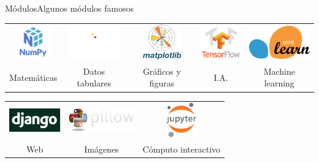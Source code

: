 \documentclass[aspectratio=169,10pt]{beamer}
\begin{document}
\begin{frame}{Módulos}{Algunos módulos famosos}
  \begin{table}[]
    \centering
    \begin{tabular}{@{}ccccc@{}}
      \includegraphics[height=1.5cm]{numpy.png} & \includegraphics[height=1.5cm]{pandas.png} & \includegraphics[height=1.5cm]{matplotlib.png} & \includegraphics[height=1.5cm]{tensorflow.png} & \includegraphics[height=1.5cm]{scikit.png} \\
      Matemáticas                               & Datos tabulares                            & Gráficos y figuras                             & I.A.                                           & Machine learning
    \end{tabular}
  \end{table}


  \begin{table}[]
    \centering
    \begin{tabular}{@{}ccc@{}}
      \includegraphics[height=1cm]{django.png} & \includegraphics[height=1cm]{pillow.png} & \includegraphics[height=1.5cm]{jupyter.png} \\
      Web                                      & Imágenes                                 & Cómputo interactivo
    \end{tabular}
  \end{table}

\end{frame}
\end{document}
